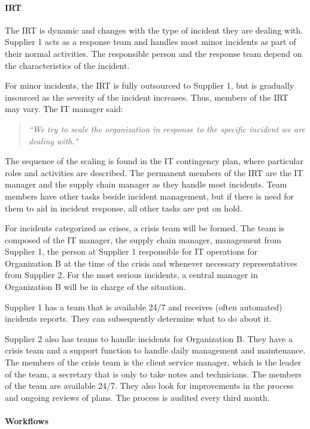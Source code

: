 \documentclass[b5paper, twoside, openright, 11pt]{report}
\begin{document}
\paragraph{\acl{IRT}}
The \ac{IRT} is dynamic and changes with the type of incident they are dealing with. Supplier 1 acts as a response team and handles most minor incidents as part of their normal activities. The responsible person and the response team depend on the characteristics of the incident.   

For minor incidents, the \ac{IRT} is fully outsourced to Supplier 1, but is gradually insourced as the severity of the incident increases. Thus, members of the \ac{IRT} may vary. The IT manager said:

\begin{quote}
\textit{``We try to scale the organization in response to the specific incident we are dealing with."}
\end{quote}

The sequence of the scaling is found in the IT contingency plan, where particular roles and activities are described. The permanent members of the \ac{IRT} are the IT manager and the supply chain manager as they handle most incidents. Team members have other tasks beside incident management, but if there is need for them to aid in incident response, all other tasks are put on hold.

For incidents categorized as crises, a crisis team will be formed. The team is composed of the IT manager, the supply chain manager, management from Supplier 1, the person at Supplier 1 responsible for IT operations for Organization B at the time of the crisis and whenever necessary representatives from Supplier 2. For the most serious incidents, a central manager in Organization B will be in charge of the situation.

Supplier 1 has a team that is available 24/7 and receives (often automated) incidents reports. They can subsequently determine what to do about it.

Supplier 2 also has teams to handle incidents for Organization B. They have a crisis team and a support function to handle daily management and maintenance. The members of the crisis team is the client service manager, which is the leader of the team, a secretary that is only to take notes and technicians. The members of the team are available 24/7. They also look for improvements in the process and ongoing reviews of plans. The process is audited every third month.

\paragraph{Workflows}
\end{document}
